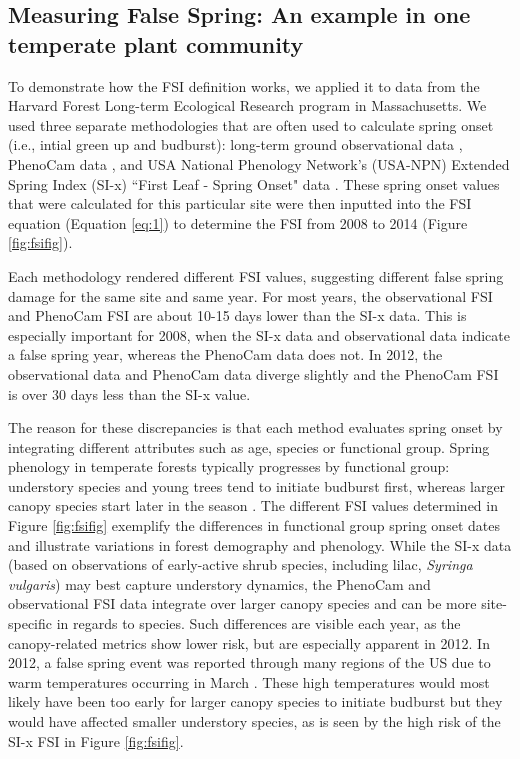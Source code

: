\documentclass{article}\usepackage[]{graphicx}\usepackage[]{color}
\begin{document}
\subsection*{Measuring False Spring: An example in one temperate plant community}
To demonstrate how the FSI definition works, we applied it to data from the Harvard Forest Long-term Ecological Research program in Massachusetts. We used three separate methodologies that are often used to calculate spring onset (i.e., intial green up and budburst): long-term ground observational data \citep{Okeefe2014}, PhenoCam data \citep{Richardson2015}, and USA National Phenology Network's (USA-NPN) Extended Spring Index (SI-x) ``First Leaf - Spring Onset" data \citep{USA-NPN2016}. These spring onset values that were calculated for this particular site were then inputted into the FSI equation (Equation \ref{eq:1}) to determine the FSI from 2008 to 2014 (Figure \ref{fig:fsifig}). 

Each methodology rendered different FSI values, suggesting different false spring damage for the same site and same year. For most years, the observational FSI and PhenoCam FSI are about 10-15 days lower than the SI-x data. This is especially important for 2008, when the SI-x data and observational data indicate a false spring year, whereas the PhenoCam data does not. In 2012, the observational data and PhenoCam data diverge slightly and the PhenoCam FSI is over 30 days less than the SI-x value.

The reason for these discrepancies is that each method evaluates spring onset by integrating different attributes such as age, species or functional group. Spring phenology in temperate forests typically progresses by functional group: understory species and young trees tend to initiate budburst first, whereas larger canopy species start later in the season \citep{Richardson2009, Xin2016}. The different FSI values determined in Figure \ref{fig:fsifig} exemplify the differences in functional group spring onset dates and illustrate variations in forest demography and phenology. While the SI-x data (based on observations of early-active shrub species, including lilac, \emph{Syringa vulgaris}) may best capture understory dynamics, the PhenoCam and observational FSI data integrate over larger canopy species and can be more site-specific in regards to species. Such differences are visible each year, as the canopy-related metrics show lower risk, but are especially apparent in 2012. In 2012, a false spring event was reported through many regions of the US due to warm temperatures occurring in March \citep{Ault2015}. These high temperatures would most likely have been too early for larger canopy species to initiate budburst but they would have affected smaller understory species, as is seen by the high risk of the SI-x FSI in Figure \ref{fig:fsifig}. 
\end{document}
